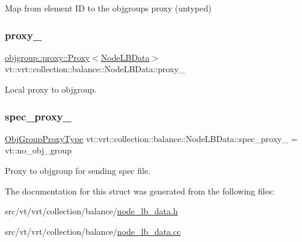 Map from element ID to the objgroup\textquotesingle{}s proxy (untyped) 

\mbox{\label{structvt_1_1vrt_1_1collection_1_1balance_1_1_node_l_b_data_a72ce69b4edce524cd5960eb3ed856f26}} 
\subsubsection{\texorpdfstring{proxy\+\_\+}{proxy\_}}
{\footnotesize\ttfamily \hyperlink{structvt_1_1objgroup_1_1proxy_1_1_proxy}{objgroup\+::proxy\+::\+Proxy}$<$\hyperlink{structvt_1_1vrt_1_1collection_1_1balance_1_1_node_l_b_data}{Node\+L\+B\+Data}$>$ vt\+::vrt\+::collection\+::balance\+::\+Node\+L\+B\+Data\+::proxy\+\_\+\hspace{0.3cm}{\ttfamily [private]}}



Local proxy to objgroup. 

\mbox{\label{structvt_1_1vrt_1_1collection_1_1balance_1_1_node_l_b_data_a6c5b8fc44e6710f090c4a78f5ffb0c71}} 
\subsubsection{\texorpdfstring{spec\+\_\+proxy\+\_\+}{spec\_proxy\_}}
{\footnotesize\ttfamily \hyperlink{namespacevt_ad7cae989df485fccca57f0792a880a8e}{Obj\+Group\+Proxy\+Type} vt\+::vrt\+::collection\+::balance\+::\+Node\+L\+B\+Data\+::spec\+\_\+proxy\+\_\+ = vt\+::no\+\_\+obj\+\_\+group\hspace{0.3cm}{\ttfamily [private]}}



Proxy to objgroup for sending spec file. 



The documentation for this struct was generated from the following files\+:\begin{DoxyCompactItemize}
\item 
src/vt/vrt/collection/balance/\hyperlink{node__lb__data_8h}{node\+\_\+lb\+\_\+data.\+h}\item 
src/vt/vrt/collection/balance/\hyperlink{node__lb__data_8cc}{node\+\_\+lb\+\_\+data.\+cc}\end{DoxyCompactItemize}

